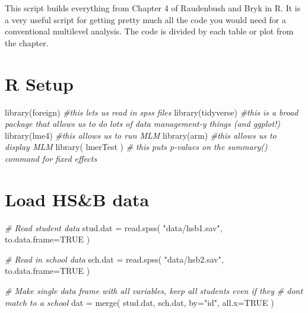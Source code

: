\documentclass[
  letterpaper,
  DIV=11,
  numbers=noendperiod]{scrreprt}
\newenvironment{Shaded}{}{}
\newcommand{\AttributeTok}[1]{\textcolor[rgb]{0.49,0.56,0.16}{#1}}
\newcommand{\CommentTok}[1]{\textcolor[rgb]{0.38,0.63,0.69}{\textit{#1}}}
\newcommand{\ConstantTok}[1]{\textcolor[rgb]{0.53,0.00,0.00}{#1}}
\newcommand{\FunctionTok}[1]{\textcolor[rgb]{0.02,0.16,0.49}{#1}}
\newcommand{\NormalTok}[1]{#1}
\newcommand{\OtherTok}[1]{\textcolor[rgb]{0.00,0.44,0.13}{#1}}
\newcommand{\StringTok}[1]{\textcolor[rgb]{0.25,0.44,0.63}{#1}}
\begin{document}
This script builds everything from Chapter 4 of Raudenbush and Bryk in
R. It is a very useful script for getting pretty much all the code you
would need for a conventional multilevel analysis. The code is divided
by each table or plot from the chapter.

\section{R Setup}\label{r-setup-2}

\begin{Shaded}
\begin{Highlighting}[]
\FunctionTok{library}\NormalTok{(foreign) }\CommentTok{\#this lets us read in spss files}
\FunctionTok{library}\NormalTok{(tidyverse) }\CommentTok{\#this is a broad package that allows us to do lots of data management{-}y things (and ggplot!)}
\FunctionTok{library}\NormalTok{(lme4) }\CommentTok{\#this allows us to run MLM}
\FunctionTok{library}\NormalTok{(arm) }\CommentTok{\#this allows us to display MLM}
\FunctionTok{library}\NormalTok{( lmerTest ) }\CommentTok{\# this puts p{-}values on the summary() command for fixed effects}
\end{Highlighting}
\end{Shaded}

\section{Load HS\&B data}\label{load-hsb-data}

\begin{Shaded}
\begin{Highlighting}[]
\CommentTok{\# Read student data}
\NormalTok{stud.dat }\OtherTok{=} \FunctionTok{read.spss}\NormalTok{( }\StringTok{"data/hsb1.sav"}\NormalTok{, }\AttributeTok{to.data.frame=}\ConstantTok{TRUE}\NormalTok{ )}

\CommentTok{\# Read in school data}
\NormalTok{sch.dat }\OtherTok{=} \FunctionTok{read.spss}\NormalTok{( }\StringTok{"data/hsb2.sav"}\NormalTok{, }\AttributeTok{to.data.frame=}\ConstantTok{TRUE}\NormalTok{ )}

\CommentTok{\# Make single data frame with all variables, keep all students even if they}
\CommentTok{\# don\textquotesingle{}t match to a school}
\NormalTok{dat }\OtherTok{=} \FunctionTok{merge}\NormalTok{( stud.dat, sch.dat, }\AttributeTok{by=}\StringTok{"id"}\NormalTok{, }\AttributeTok{all.x=}\ConstantTok{TRUE}\NormalTok{ )}
\end{Highlighting}
\end{Shaded}
\end{document}
